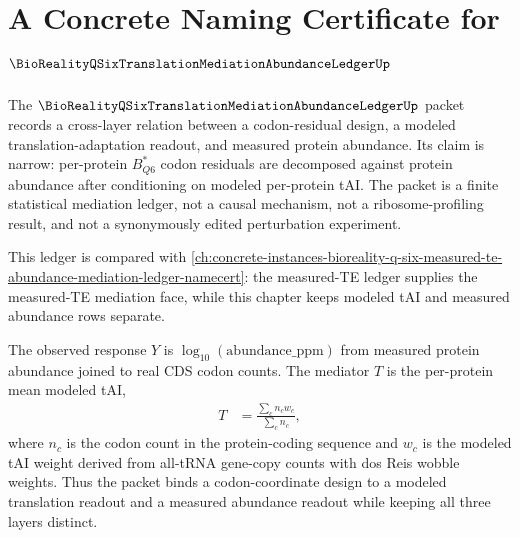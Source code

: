 \chapter{A Concrete Naming Certificate for $\BioRealityQSixTranslationMediationAbundanceLedgerUp$}
\label{ch:concrete-instances-bioreality_q_six_translation_mediation_abundance_ledger-namecert}

The $\BioRealityQSixTranslationMediationAbundanceLedgerUp$ packet records a cross-layer relation between a codon-residual design, a modeled translation-adaptation readout, and measured protein abundance. Its claim is narrow: per-protein $B^*_{Q6}$ codon residuals are decomposed against protein abundance after conditioning on modeled per-protein tAI. The packet is a finite statistical mediation ledger, not a causal mechanism, not a ribosome-profiling result, and not a synonymously edited perturbation experiment.

This ledger is compared with \autoref{ch:concrete-instances-bioreality-q-six-measured-te-abundance-mediation-ledger-namecert}: the measured-TE ledger supplies the measured-TE mediation face, while this chapter keeps modeled tAI and measured abundance rows separate.

The observed response $Y$ is $\log_{10}(\mathrm{abundance\_ppm})$ from measured protein abundance joined to real CDS codon counts. The mediator $T$ is the per-protein mean modeled tAI,
$$
\begin{aligned}
T &= \frac{\sum_c n_c w_c}{\sum_c n_c},
\end{aligned}
$$
where $n_c$ is the codon count in the protein-coding sequence and $w_c$ is the modeled tAI weight derived from all-tRNA gene-copy counts with dos Reis wobble weights. Thus the packet binds a codon-coordinate design to a modeled translation readout and a measured abundance readout while keeping all three layers distinct.

